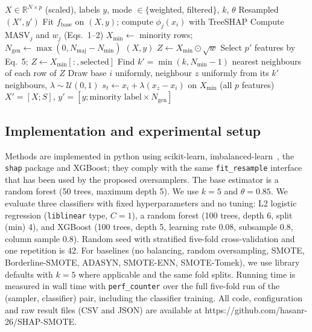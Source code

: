 \documentclass[conference]{IEEEtran}
\begin{document}
\begin{algorithm}[t]
\caption{SHAP-Guided SMOTE (one training fold)}
\label{alg:shap}
\begin{algorithmic}[1]
\REQUIRE $X\in\mathbb{R}^{N\times p}$ (scaled), labels $y$, mode $\in\{$weighted, filtered$\}$, $k$, $\theta$
\ENSURE Resampled $(X',y')$
\STATE Fit $f_{\text{base}}$ on $(X,y)$; compute $\phi_j(x_i)$ with TreeSHAP
\STATE Compute $\mathrm{MASV}_j$ and $w_j$ (Eqs.~1--2)
\STATE $X_{\min}\leftarrow$ minority rows; $N_{\text{gen}}\leftarrow\max(0,N_{\text{maj}}-N_{\text{min}})$
 \RETURN $(X,y)$ \ENDIF
{}
  \STATE $Z\leftarrow X_{\min}\odot\sqrt{w}$
\ELSE
  \STATE Select $p'$ features by Eq.~5; $Z\leftarrow X_{\min}[:,\text{selected}]$
\ENDIF
\STATE Find $k'=\min(k,N_{\text{min}}-1)$ nearest neighbours of each row of $Z$
  \STATE Draw base $i$ uniformly, neighbour $z$ uniformly from its $k'$ neighbours, $\lambda\sim\mathcal{U}(0,1)$
  \STATE $s_t\leftarrow x_i+\lambda(x_z-x_i)$ on $X_{\min}$ (all $p$ features)
\ENDFOR
\RETURN $X'=[X;S]$, $y'=[y;\text{minority label}\times N_{\text{gen}}]$
\end{algorithmic}
\end{algorithm}

\subsection{Implementation and experimental setup}
Methods are implemented in python using scikit-learn, imbalanced-learn~\cite{b18}, the \texttt{shap} package and XGBoost; they comply with the same \texttt{fit\_resample} interface that has been used by the proposed oversamplers. The base estimator is a random forest (50 trees, maximum depth 5). We use $k=5$ and $\theta=0.85$. We evaluate three classifiers with fixed hyperparameters and no tuning: L2 logistic regression (\texttt{liblinear} type, $C=1$), a random forest (100 trees, depth 6, split (min) 4), and XGBoost (100 trees, depth 5, learning rate $0.08$, subsample $0.8$, column sample $0.8$). Random seed with stratified five-fold cross-validation and one repetition is 42. For baselines (no balancing, random oversampling, SMOTE, Borderline-SMOTE, ADASYN, SMOTE-ENN, SMOTE-Tomek), we use library defaults with $k=5$ where applicable and the same fold splits. Running time is measured in wall time with \texttt{perf\_counter} over the full five-fold run of the (sampler, classifier) pair, including the classifier training. All code, configuration and raw result files (CSV and JSON) are available at https://github.com/hasanr-26/SHAP-SMOTE.
\end{document}
